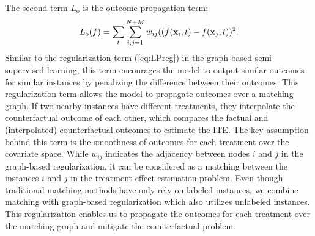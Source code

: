 The second term $L_\text{o}$ is the outcome propagation term:
\begin{equation}
\label{eq:outcome}
\begin{split}
L_\text{o}(f)=\sum_{t}\sum_{i,j=1}^{N+M}w_{ij}((f(\mathbf x_i, t)-f(\mathbf x_j, t))^{2}.
\end{split}
\end{equation}
Similar to the regularization term (\ref{eq:LPreg}) in the graph-based semi-supervised learning, this term encourages the model to output similar outcomes for similar instances by penalizing the difference between their outcomes. 
This regularization term allows the model to propagate outcomes over a matching graph.
If two nearby instances have different treatments, they interpolate the counterfactual outcome of each other, which compares the factual and (interpolated) counterfactual outcomes to estimate the ITE.
The key assumption behind this term is the smoothness of outcomes  for each treatment over the covariate space. 
While $w_{ij}$ indicates the adjacency between nodes $i$ and $j$  in the graph-based regularization, it can be considered as a matching between the instances $i$ and $j$ in the treatment effect estimation problem.
Even though traditional matching methods have only rely on labeled instances, we combine matching with graph-based regularization which also utilizes unlabeled instances. 
This regularization enables us to propagate the outcomes for each treatment over the matching graph and mitigate the counterfactual problem. 




